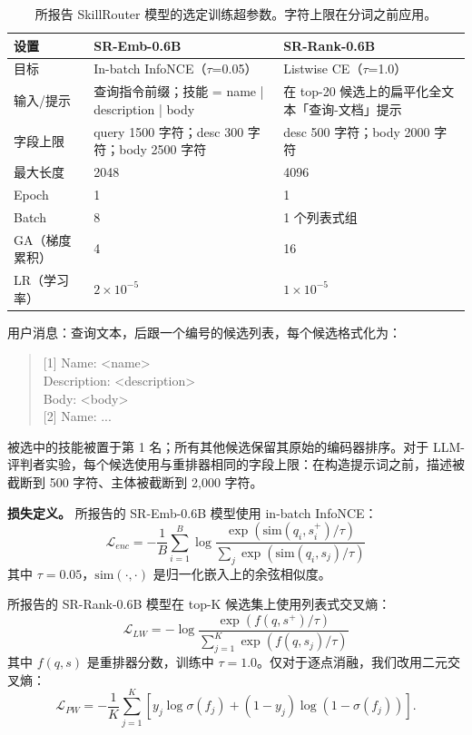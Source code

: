 \documentclass[11pt,UTF8,fontset=fandol]{ctexart}
\begin{document}
\begin{table}[H]\centering
\caption{所报告 SkillRouter 模型的选定训练超参数。字符上限在分词之前应用。}
\begin{tabular}{p{2.6cm} p{5.4cm} p{5.4cm}}
\toprule
设置 & SR-Emb-0.6B & SR-Rank-0.6B \\ \midrule
目标 & In-batch InfoNCE（$\tau$=0.05） & Listwise CE（$\tau$=1.0） \\
输入/提示 & 查询指令前缀；技能 = name | description | body & 在 top-20 候选上的扁平化全文本「查询-文档」提示 \\
字段上限 & query 1500 字符；desc 300 字符；body 2500 字符 & desc 500 字符；body 2000 字符 \\
最大长度 & 2048 & 4096 \\
Epoch & 1 & 1 \\
Batch & 8 & 1 个列表式组 \\
GA（梯度累积） & 4 & 16 \\
LR（学习率） & $2\times10^{-5}$ & $1\times10^{-5}$ \\
\bottomrule
\end{tabular}
\label{tab:16}
\end{table}

用户消息：查询文本，后跟一个编号的候选列表，每个候选格式化为：
\begin{quote}\ttfamily\small
{[}1{]} Name: {\textless}name{\textgreater}\\
Description: {\textless}description{\textgreater}\\
Body: {\textless}body{\textgreater}\\
{[}2{]} Name: ...
\end{quote}
被选中的技能被置于第 1 名；所有其他候选保留其原始的编码器排序。对于 LLM-评判者实验，每个候选使用与重排器相同的字段上限：在构造提示词之前，描述被截断到 500 字符、主体被截断到 2,000 字符。

\textbf{损失定义。} 所报告的 SR-Emb-0.6B 模型使用 in-batch InfoNCE：
\begin{equation}
\mathcal{L}_{enc} = -\frac{1}{B} \sum_{i=1}^{B} \log \frac{\exp(\mathrm{sim}(q_i, s_i^+)/\tau)}{\sum_j \exp(\mathrm{sim}(q_i, s_j)/\tau)} \tag{1}
\end{equation}
其中 $\tau = 0.05$，$\mathrm{sim}(\cdot, \cdot)$ 是归一化嵌入上的余弦相似度。

所报告的 SR-Rank-0.6B 模型在 top-K 候选集上使用列表式交叉熵：
\begin{equation}
\mathcal{L}_{LW} = -\log \frac{\exp(f(q, s^+)/\tau)}{\sum_{j=1}^{K} \exp(f(q, s_j)/\tau)} \tag{2}
\end{equation}
其中 $f(q, s)$ 是重排器分数，训练中 $\tau = 1.0$。仅对于逐点消融，我们改用二元交叉熵：
\begin{equation}
\mathcal{L}_{PW} = -\frac{1}{K} \sum_{j=1}^{K} \left[ y_j \log \sigma(f_j) + (1 - y_j) \log(1 - \sigma(f_j)) \right]. \tag{3}
\end{equation}
\end{document}
